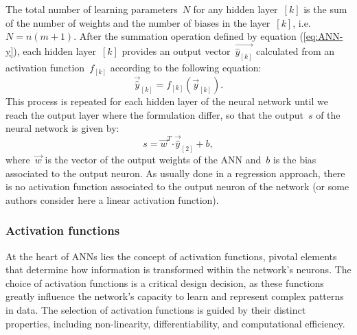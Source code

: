 \documentclass[algorithms,article,submit,pdftex,oneauthors]{Definitions/mdpi}
\DeclareRobustCommand{\dotp}{\boldsymbol{\cdot}}
\DeclareRobustCommand{\lay}[1]{_{[#1]}}
\DeclareRobustCommand{\Lay}[1]{\mbox{$[#1]$}}
\begin{document}
The total number of learning parameters~$N$ for any hidden layer~\Lay{k} is the sum of the number of weights and the number of biases in the layer~\Lay{k}, i.e. $N=n(m+1)$.
After the summation operation defined by equation (\ref{eq:ANN-y}), each hidden layer~\Lay{k} provides an output vector~$\overrightarrow{\hat{y}\lay{k}}$ calculated from an activation function~$f\lay{k}$ according to the following equation:
\begin{equation}
\overrightarrow{\hat{y}}\lay{k}=f\lay{k}(\overrightarrow{y}\lay{k}).
\label{eq:ANN-f}
\end{equation}
This process is repeated for each hidden layer of the neural network until we reach the output layer where the formulation differ, so that the output~$s$ of the neural network is given by:
\begin{equation}
s = \overrightarrow{w}^T \dotp \overrightarrow{\hat{y}}\lay{2} + b\label{eq:ANN-s},
\end{equation}
where~$\overrightarrow{w}$ is the vector of the output weights of the ANN and~$b$ is the bias associated to the output neuron.
As usually done in a regression approach, there is no activation function associated to the output neuron of the network (or some authors consider here a linear activation function).

\subsubsection{Activation functions}\label{subsubsec:ANN-act}

At the heart of ANNs lies the concept of activation functions, pivotal elements that determine how information is transformed within the network's neurons.
The choice of activation functions is a critical design decision, as these functions greatly influence the network's capacity to learn and represent complex patterns in data.
The selection of activation functions is guided by their distinct properties, including non-linearity, differentiability, and computational efficiency.
\end{document}
